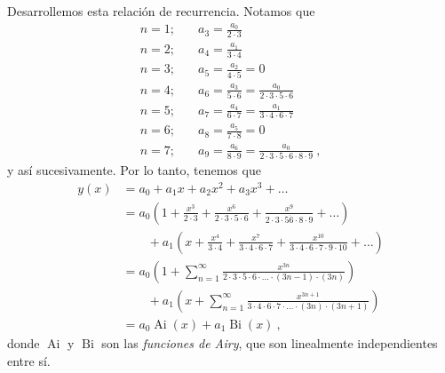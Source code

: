 \begin{ejemplo}
    Desarrollemos esta relación de recurrencia. Notamos que
    \begin{align*}
        n = 1; & \quad a_3 = \frac{a_0}{2 \cdot 3} \\
        n = 2; & \quad a_4 = \frac{a_1}{3 \cdot 4} \\
        n = 3; & \quad a_5 = \frac{a_2}{4 \cdot 5} = 0 \\
        n = 4; & \quad a_6 = \frac{a_3}{5 \cdot 6} = \frac{a_0}{2 \cdot 3 \cdot 5 \cdot 6} \\
        n = 5; & \quad a_7 = \frac{a_4}{6 \cdot 7} = \frac{a_1}{3 \cdot 4 \cdot 6 \cdot 7} \\
        n = 6; & \quad a_8 = \frac{a_5}{7 \cdot 8} = 0 \\
        n = 7; & \quad a_9 = \frac{a_6}{8 \cdot 9} = \frac{a_0}{2 \cdot 3 \cdot 5 \cdot 6 \cdot 8 \cdot 9} \ ,
    \end{align*}
    y así sucesivamente. Por lo tanto, tenemos que
    \begin{align}
        y(x) & = a_0 + a_1x + a_2 x^2 + a_3 x^3 + \dots \\
        & = a_0 \left( 1 + \frac{x^3}{2 \cdot 3} + \frac{x^6}{2 \cdot 3 \cdot 5 \cdot 6} + \frac{x^9}{2 \cdot 3 \cdot 5 \dot 6 \cdot 8 \cdot 9} + \dots \right) \\
        & \qquad + a_1 \left( x + \frac{x^4}{3 \cdot 4} + \frac{x^7}{3 \cdot 4 \cdot 6 \cdot 7} + \frac{x^{10}}{3 \cdot 4 \cdot 6 \cdot 7 \cdot 9 \cdot 10} + \dots  \right) \\
        & = a_0 \left( 1 + \sum_{n=1}^\infty \frac{x^{3n}}{2 \cdot 3 \cdot 5 \cdot 6 \cdot \dots \cdot (3n-1) \cdot (3n)} \right) \\
        & \qquad + a_1 \left( x + \sum_{n=1}^\infty \frac{x^{3n+1}}{3 \cdot 4 \cdot 6 \cdot 7 \cdot \dots \cdot (3n) \cdot (3n+1)}  \right) \\
        & = a_0 \operatorname{Ai}(x) + a_1 \operatorname{Bi}(x) \ ,
    \end{align}
    donde $\operatorname{Ai}$ y $\operatorname{Bi}$ son las \emph{funciones de Airy}, que son linealmente independientes entre sí.
\end{ejemplo}

